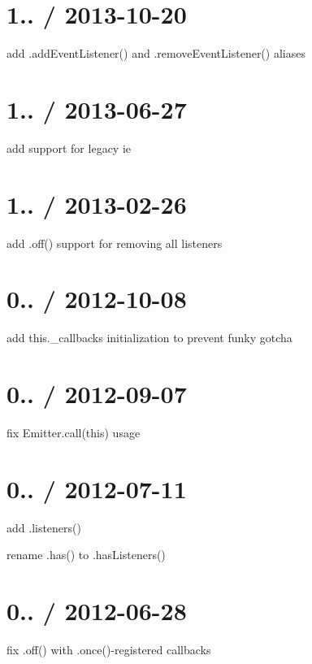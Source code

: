 \section*{1.. / 2013-\/10-\/20 }


\begin{DoxyItemize}
\item add {\ttfamily .add\+Event\+Listener()} and {\ttfamily .remove\+Event\+Listener()} aliases
\end{DoxyItemize}

\section*{1.. / 2013-\/06-\/27 }


\begin{DoxyItemize}
\item add support for legacy ie
\end{DoxyItemize}

\section*{1.. / 2013-\/02-\/26 }


\begin{DoxyItemize}
\item add {\ttfamily .off()} support for removing all listeners
\end{DoxyItemize}

\section*{0.. / 2012-\/10-\/08 }


\begin{DoxyItemize}
\item add {\ttfamily this.\+\_\+callbacks} initialization to prevent funky gotcha
\end{DoxyItemize}

\section*{0.. / 2012-\/09-\/07 }


\begin{DoxyItemize}
\item fix {\ttfamily Emitter.\+call(this)} usage
\end{DoxyItemize}

\section*{0.. / 2012-\/07-\/11 }


\begin{DoxyItemize}
\item add {\ttfamily .listeners()}
\item rename {\ttfamily .has()} to {\ttfamily .has\+Listeners()}
\end{DoxyItemize}

\section*{0.. / 2012-\/06-\/28 }


\begin{DoxyItemize}
\item fix {\ttfamily .off()} with {\ttfamily .once()}-\/registered callbacks 
\end{DoxyItemize}